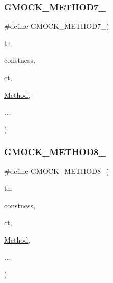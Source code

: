 \subsubsection{\texorpdfstring{GMOCK\_METHOD7\_}{GMOCK\_METHOD7\_}}
{\footnotesize\ttfamily \#define G\+M\+O\+C\+K\+\_\+\+M\+E\+T\+H\+O\+D7\+\_\+(\begin{DoxyParamCaption}\item[{}]{tn,  }\item[{}]{constness,  }\item[{}]{ct,  }\item[{}]{\mbox{\hyperlink{_obj__test_2lib_2googletest-release-1_88_81_2googlemock_2test_2gmock-spec-builders__test_8cc_a95606368148f3e5aab5db46c32466afd}{Method}},  }\item[{}]{... }\end{DoxyParamCaption})}

\mbox{\label{googletest-master_2googlemock_2include_2gmock_2gmock-generated-function-mockers_8h_aa84a36427c44505207b7cad5dec7ad67}} 
\subsubsection{\texorpdfstring{GMOCK\_METHOD8\_}{GMOCK\_METHOD8\_}}
{\footnotesize\ttfamily \#define G\+M\+O\+C\+K\+\_\+\+M\+E\+T\+H\+O\+D8\+\_\+(\begin{DoxyParamCaption}\item[{}]{tn,  }\item[{}]{constness,  }\item[{}]{ct,  }\item[{}]{\mbox{\hyperlink{_obj__test_2lib_2googletest-release-1_88_81_2googlemock_2test_2gmock-spec-builders__test_8cc_a95606368148f3e5aab5db46c32466afd}{Method}},  }\item[{}]{... }\end{DoxyParamCaption})}

\mbox{\label{googletest-master_2googlemock_2include_2gmock_2gmock-generated-function-mockers_8h_aa820171a19cc587c247dbe05cbffc55f}} 
